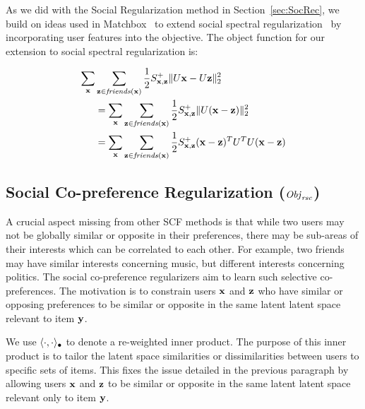 As we did with the Social Regularization method in Section~\ref{sec:SocRec}, we build on ideas used in Matchbox~\cite{matchbox} to extend social spectral regularization~\cite{sr,rrmf} by incorporating user features into the objective. The object function for our extension to social spectral regularization is:

\begin{align}
\sum_{\mathbf{x}} & \sum_{\mathbf{z} \in \mathit{friends}(\mathbf{x})} \frac{1}{2} S^+_{\mathbf{x},\mathbf{z}} \| U\mathbf{x} - U\mathbf{z} \|_2^2 \nonumber \\
& = \sum_{\mathbf{x}} \sum_{\mathbf{z} \in \mathit{friends}(\mathbf{x})} \frac{1}{2} S^+_{\mathbf{x},\mathbf{z}} \| U (\mathbf{x} - \mathbf{z}) \|_2^2 \nonumber \\
& = \sum_{\mathbf{x}} \sum_{\mathbf{z} \in \mathit{friends}(\mathbf{x})} \frac{1}{2} S^+_{\mathbf{x},\mathbf{z}} (\mathbf{x} - \mathbf{z})^T U^T U (\mathbf{x} - \mathbf{z})
\end{align}

\subsection{Social Co-preference Regularization ($\mathit{Obj}_{\mathit{rsc}}$)}
\label{sec:rsc}

A crucial aspect missing from other SCF methods is that while two users may not be globally similar or opposite 
in their preferences, there may be sub-areas of their interests which can be correlated to each other.
For example, two friends may have similar interests concerning music, but 
different interests concerning politics.  The social co-preference regularizers
aim to learn such selective co-preferences. The motivation is to constrain users $\mathbf{x}$
and $\mathbf{z}$ who have similar or opposing
preferences to be similar or opposite in the same latent latent space
relevant to item $\mathbf{y}$.  

We use $\langle \cdot, \cdot \rangle_{\bullet}$ to denote a re-weighted inner product. The purpose of this inner product is to tailor the latent space similarities or dissimilarities between users to specific sets of items. This fixes the issue detailed in the previous paragraph by allowing users $\mathbf{x}$
and $\mathbf{z}$ to be similar or opposite in the same latent latent space
relevant only to item $\mathbf{y}$.  

